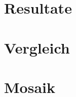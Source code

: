 

\section{Resultate}
\label{sec:results}

\section{Vergleich}
\label{sec:comparision}

\section{Mosaik}
\label{sec:mosaic}